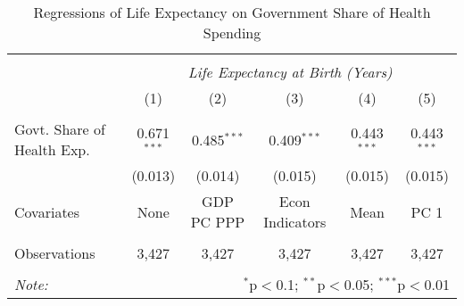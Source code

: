 \begin{table}[!htbp] \centering
  \caption{Regressions of Life Expectancy on Government Share of Health Spending \label{main_regs}}
\begin{tabular}{@{\extracolsep{5pt}}lccccc}
\\[-1.8ex]\hline
\hline \\[-1.8ex]
& \multicolumn{5}{c}{\textit{Life Expectancy at Birth (Years)}} \
\cr \
\\[-1.8ex] & (1) & (2) & (3) & (4) & (5) \\
\hline \\[-1.8ex]
 Govt. Share of Health Exp. & 0.671$^{***}$ & 0.485$^{***}$ & 0.409$^{***}$ & 0.443$^{***}$ & 0.443$^{***}$ \\
  & (0.013) & (0.014) & (0.015) & (0.015) & (0.015) \\
 Covariates & None & GDP PC PPP & Econ Indicators & Mean & PC 1 \\
\hline \\[-1.8ex]
 Observations & 3,427 & 3,427 & 3,427 & 3,427 & 3,427 \\
\hline
\hline \\[-1.8ex]
\textit{Note:} & \multicolumn{5}{r}{$^{*}$p$<$0.1; $^{**}$p$<$0.05; $^{***}$p$<$0.01} \\
\end{tabular}
\end{table}